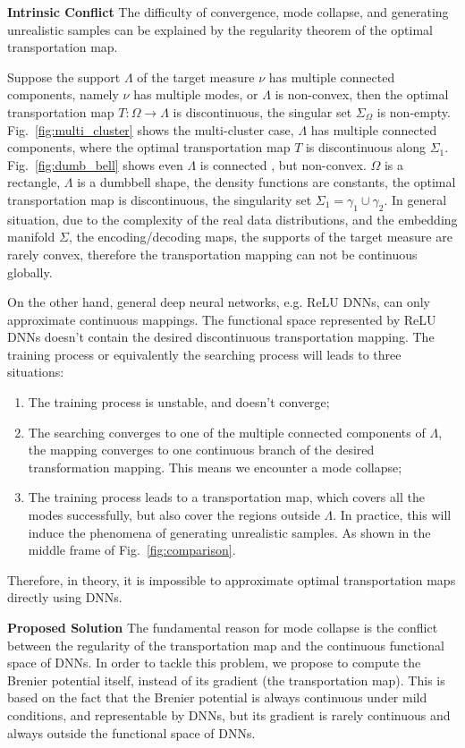 \documentclass{article}
\begin{document}
\noindent\textbf{Intrinsic Conflict} 
The difficulty of convergence, mode collapse, and generating unrealistic samples can be explained by the regularity theorem of the optimal transportation map. 

Suppose the support $\Lambda$ of the target measure $\nu$ has multiple connected components, namely $\nu$ has multiple modes, or $\Lambda$ is non-convex, then the optimal transportation map $T:\Omega\to\Lambda$ is discontinuous, the singular set $\Sigma_\Omega$ is non-empty. Fig.~\ref{fig:multi_cluster} shows the multi-cluster case, $\Lambda$ has multiple connected components, where the optimal transportation map $T$ is discontinuous along $\Sigma_1$. Fig.~\ref{fig:dumb_bell} shows even $\Lambda$ is connected , but non-convex. $\Omega$ is a rectangle, $\Lambda$ is a dumbbell shape, the density functions are constants, the optimal transportation map is discontinuous, the singularity set $\Sigma_1 = \gamma_1 \cup \gamma_2$. In general situation, due to the complexity of the real data distributions, and the embedding manifold $\Sigma$, the encoding/decoding maps, the supports of the target measure 
are rarely convex, therefore the transportation mapping can not be continuous globally.

On the other hand, general deep neural networks, e.g. ReLU DNNs, can only approximate continuous mappings. The functional space represented by ReLU DNNs doesn't contain the desired discontinuous transportation mapping. The training process or equivalently the searching process will leads to three situations:
\begin{enumerate}
\item The training process is unstable, and doesn't converge;
\item The searching converges to one of the multiple connected components of $\Lambda$, the mapping converges to one continuous branch of the desired transformation mapping. This means we encounter a mode collapse;
\item The training process leads to a transportation map, which covers all the modes successfully, but also cover the regions outside $\Lambda$. In practice, this will induce the phenomena of generating unrealistic samples. As shown in the middle frame of Fig.~\ref{fig:comparison}.
\end{enumerate} 
Therefore, in theory, it is impossible to approximate optimal transportation maps directly using DNNs.

\noindent\textbf{Proposed Solution} 
The fundamental reason for mode collapse is the conflict between the regularity of the transportation map and the continuous functional space of DNNs. In order to tackle this problem, we propose to compute the Brenier potential itself, instead of its gradient (the transportation map). This is based on the fact that the Brenier potential is always continuous 
under mild conditions, and representable by DNNs, but its gradient is rarely continuous and always outside the functional space of DNNs.
\end{document}
